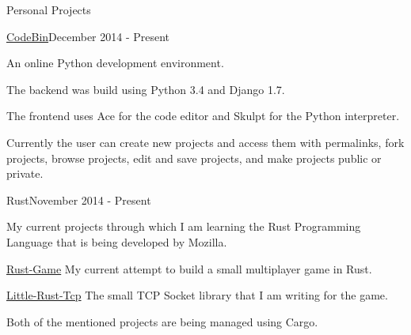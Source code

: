 \documentclass{resume} %
\begin{document}
\begin{rSection}{Personal Projects}

\begin{rSubsection}{\href{https://github.com/dcjohnson/CodeBin}{CodeBin}}{December 2014 - Present}{}{}

	\item An online Python development environment.
	\item The backend was build using Python 3.4 and Django 1.7.
	\item The frontend uses Ace for the code editor and Skulpt for the Python interpreter.
	\item Currently the user can create new projects and access them with permalinks, fork projects, browse projects, edit and save projects, and make projects public or private.
\end{rSubsection}

\begin{rSubsection}{Rust}{November 2014 - Present}{}{}
	\item My current projects through which I am learning the Rust Programming Language that is being developed by Mozilla.
	\item {\href{https://github.com/dcjohnson/Rust-Game}{Rust-Game}} My current attempt to build a small multiplayer game in Rust.
	\item {\href{https://github.com/dcjohnson/Little-Rust-Tcp}{Little-Rust-Tcp}} The small TCP Socket library that I am writing for the game.
	\item Both of the mentioned projects are being managed using Cargo.
\end{rSubsection}

\end{rSection}

\end{document}
